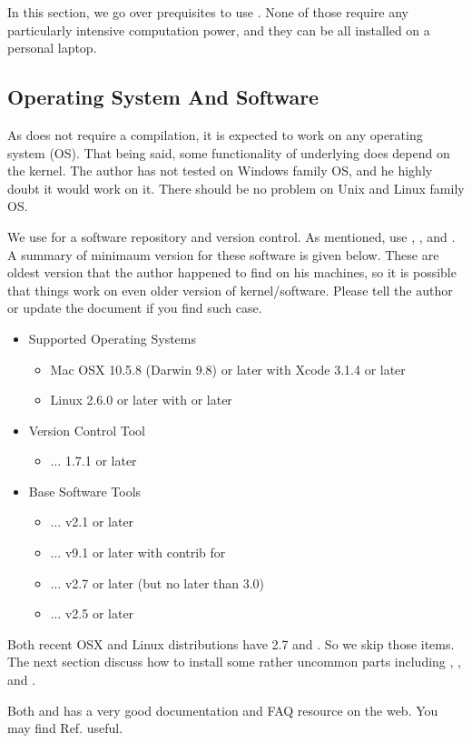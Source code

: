 In this section, we go over prequisites to use {\pubs}. None of those require any
particularly intensive computation power, and they can be all installed on a 
personal laptop.

\subsection{Operating System And Software}
As {\pubs} does not require a compilation, it is expected to work on any operating system (OS).
That being said, some functionality of underlying {\python} does depend on the kernel. 
The author has not tested on Windows family OS, and he highly doubt it would work on it. 
There should be no problem on Unix and Linux family OS. 

We use {\git} for a software repository and version control. As mentioned, {\pubs} use
{\php}, {\psql}, and {\python}. A summary of minimaum version for these software is given
below. These are oldest version that the author happened to find on his machines, so it
is possible that things work on even older version of kernel/software. Please tell the 
author or update the document if you find such case.

\begin{itemize}
\item Supported Operating Systems
    \begin{itemize}
    \item Mac OSX 10.5.8 (Darwin 9.8) or later with Xcode 3.1.4 or later
    \item Linux 2.6.0 or later with  or later
    \end{itemize}
\item Version Control Tool
    \begin{itemize}
    \item {\git} $\ldots$ 1.7.1 or later
    \end{itemize}
\item Base Software Tools
    \begin{itemize}
    \item {\php} $\ldots$ v2.1 or later
    \item {\psql}$\ldots$  v9.1 or later with {\ttfamily contrib} for {\hstore}
    \item {\python} $\ldots$ v2.7 or later (but no later than 3.0)
    \item {\psycopg} $\ldots$ v2.5 or later
    \end{itemize}
\end{itemize}
Both recent OSX and Linux distributions have {\python} 2.7 and {\git}. So we skip
those items. The next section discuss how to install some rather uncommon parts
including {\psql}, {\hstore}, and {\psycopg}.

Both {\psql} and {\python} has a very good documentation and FAQ resource on the web.
You may find Ref.\cite{PythonDoc,PSQLDoc} useful.
